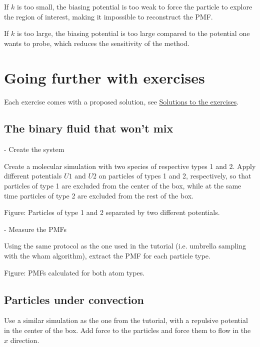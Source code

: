 \vspace{0.25cm} \noindent If $k$ is too small, the biasing potential is too weak to
force the particle to explore the 
region of interest, making it impossible to reconstruct the PMF.

\vspace{0.25cm} \noindent If $k$ is too large, the biasing potential is too large 
compared to the potential one wants to probe, which reduces the 
sensitivity of the method.

\section{Going further with exercises}
\noindent Each exercise comes with a proposed solution, 
see \hyperref[solutions-label]{Solutions to the exercises}.

\subsection{The binary fluid that won't mix}
 - Create the system\textit{}

\vspace{0.25cm} \noindent Create a molecular simulation with two species of respective types 1 and 2.
Apply different potentials $U1$ and $U2$ on particles of
types 1 and 2, respectively, so that particles of type 1 are excluded
from the center of the box, while at the same time particles
of type 2 are excluded from the rest of the box.

\vspace{0.25cm} Figure: Particles of type 1 and 2 separated by two different potentials.

\vspace{0.25cm}  - Measure the PMFs\textit{}

\vspace{0.25cm} \noindent Using the same protocol as the one used in the tutorial
(i.e. umbrella sampling with the wham algorithm),
extract the PMF for each particle type.

\vspace{0.25cm} Figure: PMFs calculated for both atom types. 

\subsection{Particles under convection}
\noindent Use a similar simulation as the one from the tutorial,
with a repulsive potential in the center
of the box. Add force to the particles
and force them to flow in the $x$ direction.

